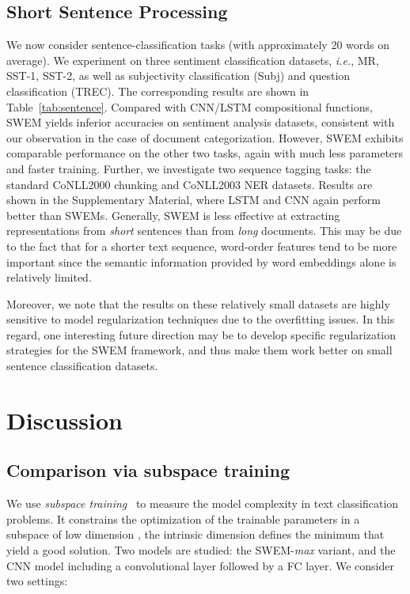 \documentclass[11pt,a4paper]{article}
\begin{document}
\subsection{Short Sentence Processing} \label{short}
We now consider sentence-classification tasks (with approximately 20 words on average).
We experiment on three sentiment classification datasets, \emph{i.e.}, MR, SST-1, SST-2, as well as subjectivity classification (Subj) and question classification (TREC).
The corresponding results are shown in Table~\ref{tab:sentence}.
Compared with CNN/LSTM compositional functions, SWEM yields inferior accuracies on sentiment analysis datasets, consistent with our observation in the case of document categorization.
However, SWEM exhibits comparable performance on the other two tasks, again with much less parameters and faster training.
Further, we investigate two sequence tagging tasks: the standard CoNLL2000 chunking and CoNLL2003 NER datasets.
Results are shown in the Supplementary Material, where LSTM and CNN again perform better than SWEMs.
Generally, SWEM is less effective at extracting representations from \emph{short} sentences than from \emph{long} documents.
This may be due to the fact that for a shorter text sequence, word-order features tend to be more important since the semantic information provided by word embeddings alone is relatively limited.

Moreover, we note that the results on these relatively small datasets are highly sensitive to model regularization techniques due to the overfitting issues.
In this regard, one interesting future direction may be to develop specific regularization strategies for the SWEM framework, and thus make them work better on small sentence classification datasets.






\section{Discussion}

\subsection{Comparison via subspace training}

We use {\it subspace training}~\cite{li_id_2018_ICLR}  to measure the model complexity in text classification problems. It constrains the optimization of the trainable parameters in a subspace of low dimension , the intrinsic dimension  defines the minimum  that yield a good solution. Two models are studied: the SWEM-\emph{max} variant, and the CNN model including a convolutional layer followed by a FC layer.
We consider two settings:
\end{document}
